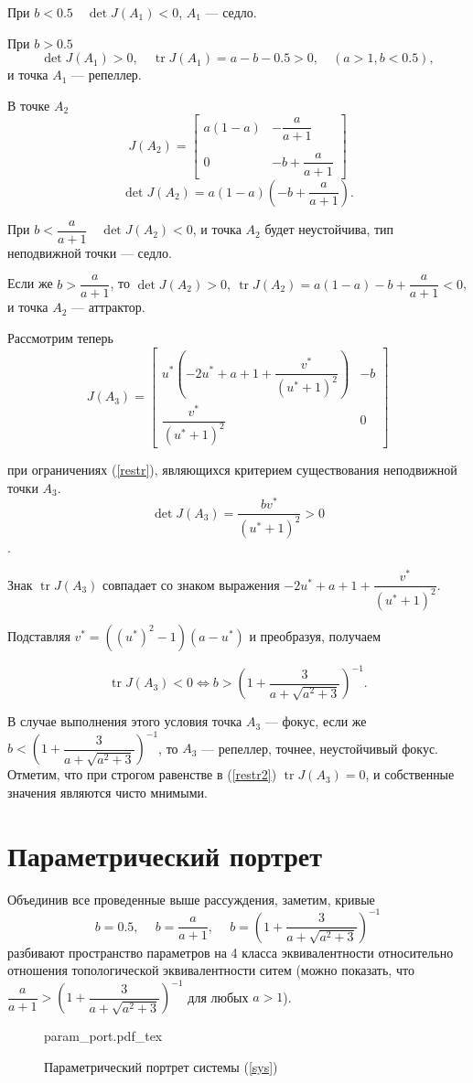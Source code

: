 \documentclass[16pt]{article}
\newcommand{\incfig}[2]{%
    \def\svgwidth{#2 mm}
    {#1.pdf_tex}
}
\DeclareMathOperator{\Det}{det}
\DeclareMathOperator{\Tr}{tr}
\newcommand\Pict[3]{
\begin{figure}[h!]
    \centering
    \incfig{#1}{#3}
    \caption{#2}
    \label{fig:#1}
\end{figure}
}
\begin{document}
При $b < 0.5 \quad \Det J(A_1) < 0$, $A_1$ --- седло.

При $b > 0.5$ $$\Det J(A_1) > 0, \quad \Tr J(A_1) = a - b - 0.5 > 0, \quad (a > 1, b < 0.5),$$
и точка $A_1$ --- репеллер.

В точке $A_2$
$$J(A_2) = \begin{bmatrix}
a(1 - a) & -\dfrac{a}{a+1} \\\\

0        & -b + \dfrac{a}{a+1}
\end{bmatrix}
$$
$$\Det J(A_2) = a(1-a)\left(-b + \dfrac{a}{a+1}\right).$$

При $b < \dfrac{a}{a+1} \quad \Det J(A_2) < 0$, и точка $A_2$ будет неустойчива, тип неподвижной точки --- седло.

Если же $b > \dfrac{a}{a+1}$, то $\Det J(A_2) > 0, \ \Tr J(A_2) = a(1-a) -b + \dfrac{a}{a+1} < 0$, и точка
$A_2$ --- аттрактор.

Рассмотрим теперь 
$$J(A_3) = \begin{bmatrix}
u^*\left(-2u^*+a+1 + \dfrac{v^*}{(u^*+1)^2}\right) & -b \\

\dfrac{v^*}{(u^*+1)^2}        & 0
\end{bmatrix}
$$

при ограничениях (\ref{restr}), являющихся критерием существования неподвижной точки $A_3$.
$$\Det J(A_3) = \dfrac{bv^*}{(u^* + 1)^2} > 0$$.

Знак $\Tr J(A_3)$ совпадает со знаком выражения 
$-2u^*+a+1 + \dfrac{v^*}{(u^*+1)^2}$. 

Подставляя $v^* = ((u^*)^2-1)(a-u^*)$ и преобразуя, получаем

\begin{equation}\label{restr2}
\Tr J(A_3) < 0 \Leftrightarrow b > \left(1 + \dfrac{3}{a+\sqrt{a^2+3}}\right)^{-1}.
\end{equation}

В случае выполнения этого условия точка $A_3$ --- фокус, если же 
$b < \left(1 + \dfrac{3}{a+\sqrt{a^2+3}}\right)^{-1}$, то $A_3$ --- репеллер, точнее, неустойчивый фокус.
 Отметим, что при строгом равенстве в
(\ref{restr2}) $\Tr J(A_3) = 0$, и собственные значения являются чисто мнимыми. 


\section{Параметрический портрет}
Объединив все проведенные выше рассуждения, заметим, кривые 
$$b = 0.5, \quad \ b = \dfrac{a}{a+1}, \quad \ b =  \left(1 + \dfrac{3}{a+\sqrt{a^2+3}}\right)^{-1}$$
разбивают пространство параметров на 4 класса эквивалентности относительно отношения топологической 
эквивалентности ситем (можно показать, что
$\dfrac{a}{a+1} > \left(1 + \dfrac{3}{a+\sqrt{a^2+3}}\right)^{-1}$ для любых $a > 1$).
\Pict{param_port}{Параметрический портрет системы (\ref{sys})}{90} 
\end{document}
